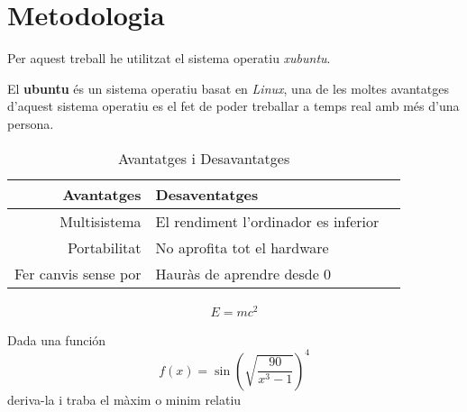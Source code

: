 \chapter{Metodologia}
Per aquest treball he utilitzat el sistema operatiu \textit{xubuntu}\cite{xubuntu}.
\vspace{0.3truecm}

El \textbf{ubuntu} és un sistema operatiu basat en \textit{Linux}, una de les moltes avantatges d'aquest sistema operatiu es el fet de poder treballar a temps real amb més d'una persona.

\begin{table}[h!]
\begin{center}
\begin{tabular}{| r | l | c |}
\hline Avantatges & Desaventatges\\ \hline
\hline Multisistema & El rendiment l'ordinador es inferior \\
\hline Portabilitat & No aprofita tot el hardware \\
\hline Fer canvis sense por & Hauràs de aprendre desde 0 \\ \hline
\end{tabular}
\caption{Avantatges i Desavantatges}
\label{tab:prosicontra}
\end{center}
\end{table}

\begin{align}
  E=mc^2
\end{align}

Dada una función
\begin{equation}
f(x)= \sin(\sqrt{\frac{90}{x^3-1}})^4
\end{equation}
deriva-la i traba el màxim o minim relatiu



